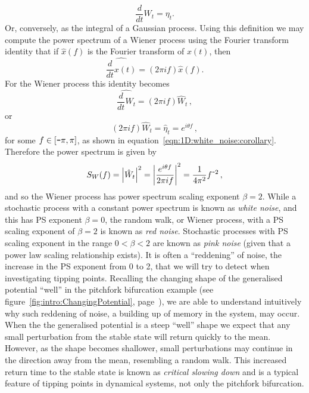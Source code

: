 {{\begin{equation}
	\label{eqn:1D:Wiener_process}
	\frac{d}{dt}W_t = \eta_t.
\end{equation}
Or, conversely, as the integral of a Gaussian process. Using this definition we may compute the power spectrum of a Wiener process using the Fourier transform identity that if $\hat{x}(f)$ is the Fourier transform of $x(t)$, then 
\begin{equation}
	\widehat{\frac{d}{dt}x(t)} = (2\pi i f)\hat{x}(f).
\end{equation} 
For the Wiener process this identity becomes
\begin{equation}
	\widehat{\frac{d}{dt}W_t} = (2\pi i f)\hat{W}_t\,,
\end{equation} 
or
\begin{equation}
	(2\pi i f)\hat{W}_t = \hat{\eta}_t = e^{i\theta f}\,,
\end{equation} 
for some $f\in[\textup{\texttt{-}}\pi, \pi]$, as shown in equation~\ref{eqn:1D:white_noise:corollary}. Therefore the power spectrum is given by
\begin{equation}
	\label{eqn:1D:rednoise_scalingfactor}
	S_W(f) = \left|\hat{W}_t\right|^2 = \left|\frac{e^{i\theta f}}{2\pi i f}\right|^2 = \frac{1}{4\pi^2}f^{\textup{\texttt{-}} 2}\,,
\end{equation} 
and so the Wiener process has power spectrum scaling exponent $\beta = 2$. While a stochastic process with a constant power spectrum is known as \emph{white noise}, and this has PS exponent $\beta =0$, the random walk, or Wiener process, with a PS scaling exponent of $\beta = 2$ is known as \emph{red noise}. Stochastic processes with PS scaling exponent in the range $0<\beta<2$ are known as \emph{pink noise} (given that a power law scaling relationship exists). It is often a ``reddening'' of noise, the increase in the PS exponent from 0 to 2, that we will try to detect when investigating tipping points. Recalling the changing shape of the generalised potential ``well'' in the pitchfork bifurcation example (see figure~\ref{fig:intro:ChangingPotential}, page~\pageref{fig:intro:ChangingPotential}), we are able to understand intuitively why such reddening of noise, a building up of memory in the system, may occur. When the the generalised potential is a steep ``well'' shape we expect that any small perturbation from the stable state will return quickly to the mean. However, as the shape becomes shallower, small perturbations may continue in the direction away from the mean, resembling a random walk. This increased return time to the stable state is known as \emph{critical slowing down} \cite{scheffer2009critical} and is a typical feature of tipping points in dynamical systems, not only the pitchfork bifurcation. 

}}
